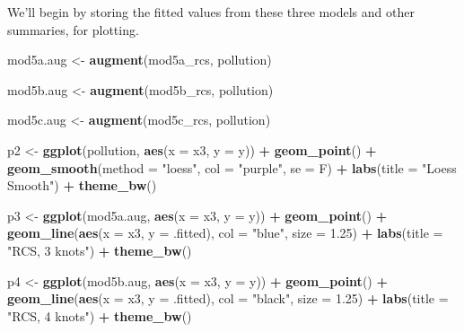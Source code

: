\documentclass[]{book}
\newenvironment{Shaded}{\begin{snugshade}}{\end{snugshade}}
\newcommand{\KeywordTok}[1]{\textcolor[rgb]{0.13,0.29,0.53}{\textbf{#1}}}
\newcommand{\DataTypeTok}[1]{\textcolor[rgb]{0.13,0.29,0.53}{#1}}
\newcommand{\FloatTok}[1]{\textcolor[rgb]{0.00,0.00,0.81}{#1}}
\newcommand{\StringTok}[1]{\textcolor[rgb]{0.31,0.60,0.02}{#1}}
\newcommand{\OperatorTok}[1]{\textcolor[rgb]{0.81,0.36,0.00}{\textbf{#1}}}
\newcommand{\NormalTok}[1]{#1}
\theoremstyle{definition}
\theoremstyle{definition}
\theoremstyle{definition}
\theoremstyle{remark}
\begin{document}
We'll begin by storing the fitted values from these three models and
other summaries, for plotting.

\begin{Shaded}
\begin{Highlighting}[]
\NormalTok{mod5a.aug <-}\StringTok{ }\KeywordTok{augment}\NormalTok{(mod5a_rcs, pollution)}

\NormalTok{mod5b.aug <-}\StringTok{ }\KeywordTok{augment}\NormalTok{(mod5b_rcs, pollution)}

\NormalTok{mod5c.aug <-}\StringTok{ }\KeywordTok{augment}\NormalTok{(mod5c_rcs, pollution)}
\end{Highlighting}
\end{Shaded}

\begin{Shaded}
\begin{Highlighting}[]
\NormalTok{p2 <-}\StringTok{ }\KeywordTok{ggplot}\NormalTok{(pollution, }\KeywordTok{aes}\NormalTok{(}\DataTypeTok{x =}\NormalTok{ x3, }\DataTypeTok{y =}\NormalTok{ y)) }\OperatorTok{+}
\StringTok{    }\KeywordTok{geom_point}\NormalTok{() }\OperatorTok{+}
\StringTok{    }\KeywordTok{geom_smooth}\NormalTok{(}\DataTypeTok{method =} \StringTok{"loess"}\NormalTok{, }\DataTypeTok{col =} \StringTok{"purple"}\NormalTok{, }\DataTypeTok{se =}\NormalTok{ F) }\OperatorTok{+}
\StringTok{    }\KeywordTok{labs}\NormalTok{(}\DataTypeTok{title =} \StringTok{"Loess Smooth"}\NormalTok{) }\OperatorTok{+}
\StringTok{    }\KeywordTok{theme_bw}\NormalTok{()}

\NormalTok{p3 <-}\StringTok{ }\KeywordTok{ggplot}\NormalTok{(mod5a.aug, }\KeywordTok{aes}\NormalTok{(}\DataTypeTok{x =}\NormalTok{ x3, }\DataTypeTok{y =}\NormalTok{ y)) }\OperatorTok{+}
\StringTok{    }\KeywordTok{geom_point}\NormalTok{() }\OperatorTok{+}
\StringTok{    }\KeywordTok{geom_line}\NormalTok{(}\KeywordTok{aes}\NormalTok{(}\DataTypeTok{x =}\NormalTok{ x3, }\DataTypeTok{y =}\NormalTok{ .fitted), }
              \DataTypeTok{col =} \StringTok{"blue"}\NormalTok{, }\DataTypeTok{size =} \FloatTok{1.25}\NormalTok{) }\OperatorTok{+}
\StringTok{    }\KeywordTok{labs}\NormalTok{(}\DataTypeTok{title =} \StringTok{"RCS, 3 knots"}\NormalTok{) }\OperatorTok{+}
\StringTok{    }\KeywordTok{theme_bw}\NormalTok{()}

\NormalTok{p4 <-}\StringTok{ }\KeywordTok{ggplot}\NormalTok{(mod5b.aug, }\KeywordTok{aes}\NormalTok{(}\DataTypeTok{x =}\NormalTok{ x3, }\DataTypeTok{y =}\NormalTok{ y)) }\OperatorTok{+}
\StringTok{    }\KeywordTok{geom_point}\NormalTok{() }\OperatorTok{+}
\StringTok{    }\KeywordTok{geom_line}\NormalTok{(}\KeywordTok{aes}\NormalTok{(}\DataTypeTok{x =}\NormalTok{ x3, }\DataTypeTok{y =}\NormalTok{ .fitted), }
              \DataTypeTok{col =} \StringTok{"black"}\NormalTok{, }\DataTypeTok{size =} \FloatTok{1.25}\NormalTok{) }\OperatorTok{+}
\StringTok{    }\KeywordTok{labs}\NormalTok{(}\DataTypeTok{title =} \StringTok{"RCS, 4 knots"}\NormalTok{) }\OperatorTok{+}
\StringTok{    }\KeywordTok{theme_bw}\NormalTok{()}


\end{Highlighting}
\end{Shaded}
\end{document}
